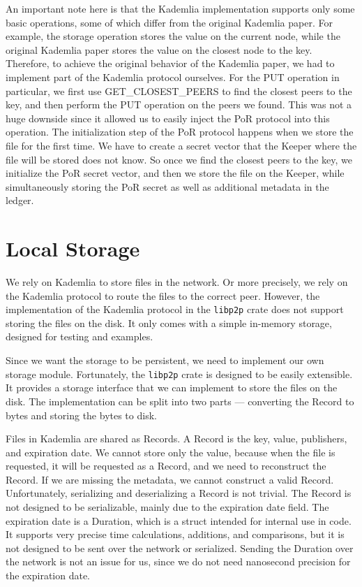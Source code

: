 An important note here is that the Kademlia implementation supports only some basic operations,
some of which differ from the original Kademlia paper.
For example, the storage operation stores the value on the current node,
while the original Kademlia paper stores the value on the closest node to the key.
Therefore, to achieve the original behavior of the Kademlia paper,
we had to implement part of the Kademlia protocol ourselves.
For the PUT operation in particular, we first use GET\_CLOSEST\_PEERS to find the closest peers to the key,
and then perform the PUT operation on the peers we found.
This was not a huge downside since it allowed us to easily inject the PoR protocol into this operation.
The initialization step of the PoR protocol happens when we store the file for the first time.
We have to create a secret vector that the Keeper where the file will be stored does not know.
So once we find the closest peers to the key, we initialize the PoR secret vector,
and then we store the file on the Keeper,
while simultaneously storing the PoR secret as well as additional metadata in the ledger.

\section{Local Storage}

We rely on Kademlia to store files in the network.
Or more precisely, we rely on the Kademlia protocol to route the files to the correct peer.
However, the implementation of the Kademlia protocol in
the \texttt{libp2p} crate does not support storing the files on the disk.
It only comes with a simple in-memory storage, designed for testing and examples.

Since we want the storage to be persistent, we need to implement our own storage module.
Fortunately, the \texttt{libp2p} crate is designed to be easily extensible.
It provides a storage interface that we can implement to store the files on the disk.
The implementation can be split into two parts --- converting the Record to bytes
and storing the bytes to disk.

Files in Kademlia are shared as Records.
A Record is the key, value, publishers, and expiration date.
We cannot store only the value, because when the file is requested,
it will be requested as a Record, and we need to reconstruct the Record.
If we are missing the metadata, we cannot construct a valid Record.
Unfortunately, serializing and deserializing a Record is not trivial.
The Record is not designed to be serializable, mainly due to the expiration date field.
The expiration date is a Duration, which is a struct intended for internal use in code.
It supports very precise time calculations, additions, and comparisons,
but it is not designed to be sent over the network or serialized.
Sending the Duration over the network is not an issue for us,
since we do not need nanosecond precision for the expiration date.

